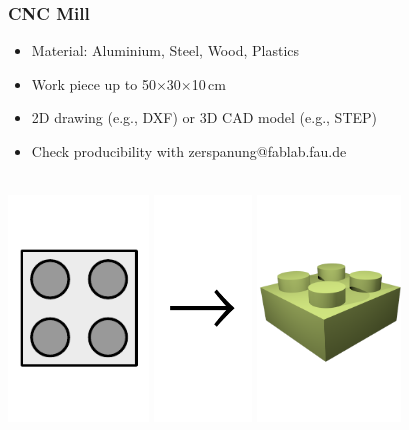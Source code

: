 \documentclass[t]{beamer}
\begin{document}
\begin{frame}
    \frametitle{CNC Mill}
    \begin{itemize}
        \item Material: Aluminium, Steel, Wood, Plastics
        \item Work piece up to 50$\times$30$\times$10\,cm
        \item 2D drawing (e.g., DXF) or 3D CAD model (e.g., STEP)
        \item Check producibility with {\color{blue} zerspanung@fablab.fau.de}
    \end{itemize}
    \begin{center}
    ~\\
    \includegraphics[height=6cm]{../img/legozeichnung.pdf}
    \includegraphics[height=6cm]{../img/pfeil.pdf}
    \includegraphics[height=6cm]{../img/fraese-lego-3d.png}

\end{center}
\end{frame}
\end{document}
